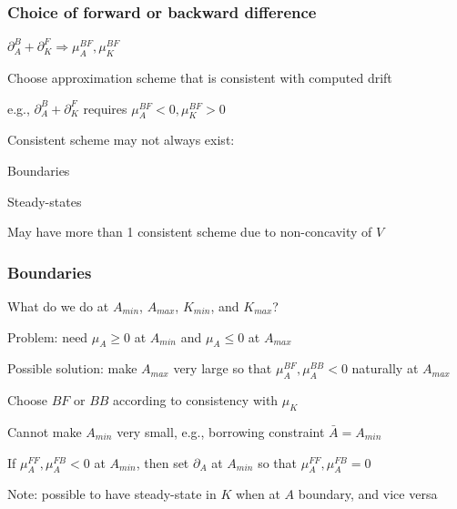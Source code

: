 \documentclass[aspectratio=169]{beamer}
\newenvironment{wideitemize}{\itemize\addtolength{\itemsep}{10pt}}{\enditemize}
\begin{document}
\begin{frame}
    \frametitle{Choice of forward or backward difference}

    \begin{wideitemize}
        \item $\partial_A^B + \partial_K^F \Rightarrow \mu_A^{BF}, \mu_K^{BF}$
        \item Choose approximation scheme that is consistent with computed drift
        \item e.g., $\partial_A^B + \partial_K^F$ requires $\mu_A^{BF} < 0, \mu_K^{BF} > 0$
        \item Consistent scheme may not always exist:
        \begin{wideitemize}
            \item Boundaries
            \item Steady-states
        \end{wideitemize}
        \item May have more than 1 consistent scheme due to non-concavity of $V$
    \end{wideitemize}

\end{frame}

\begin{frame}
    \frametitle{Boundaries}

    \begin{wideitemize}
        \item What do we do at $A_{min}$, $A_{max}$, $K_{min}$, and $K_{max}$?
        \item Problem: need $\mu_{A} \geq 0$ at $A_{min}$ and $\mu_{A} \leq 0$ at $A_{max}$
        \item Possible solution: make $A_{max}$ very large so that $\mu_{A}^{BF}, \mu_{A}^{BB} < 0$ naturally at $A_{max}$
        \item Choose $BF$ or $BB$ according to consistency with $\mu_{K}$
        \item Cannot make $A_{min}$ very small, e.g., borrowing constraint $\bar{A} = A_{min}$
        \item If $\mu_A^{FF}, \mu_A^{FB} < 0$ at $A_{min}$, then set $\partial_A$ at $A_{min}$ so that $\mu_A^{FF}, \mu_A^{FB} = 0$
        \item Note: possible to have steady-state in $K$ when at $A$ boundary, and vice versa
    \end{wideitemize}

\end{frame}
\end{document}
